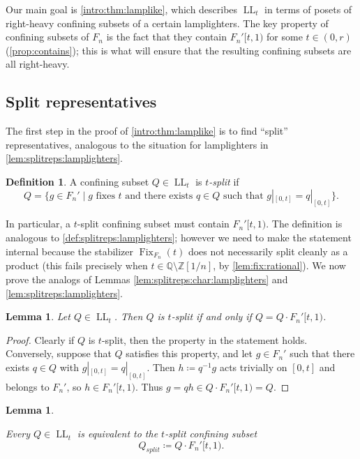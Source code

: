 \documentclass[reqno,12pt]{amsart}\setcounter{tocdepth}{1}
\newtheorem{lemma}[theorem]{Lemma}
\theoremstyle{definition}
\newtheorem{definition}[theorem]{Definition}
\newcommand{\Z}{\mathbb{Z}}
\newcommand{\Q}{\mathbb{Q}}
\DeclareMathOperator{\Fix}{Fix}
\DeclareMathOperator{\LL}{LL}
\numberwithin{equation}{section}
\begin{document}
Our main goal is \cref{intro:thm:lamplike}, which describes $\LL_t$ in terms of posets of right-heavy confining subsets of a certain lamplighters. The key property of confining subsets of $F_n$ is the fact that they contain $F_n'[t, 1)$ for some $t \in (0, r)$ (\cref{prop:contains}); this is what will ensure that the resulting confining subsets are all right-heavy.


\subsection{Split representatives}

The first step in the proof of \cref{intro:thm:lamplike} is to find ``split'' representatives, analogous to the situation for lamplighters in \cref{lem:splitreps:lamplighters}.

\begin{definition}
\label{def:splitreps:thompson}
A confining subset $Q \in \LL_t$ is \emph{$t$-split} if
\[Q = \{ g \in F_n' \mid g\text{ fixes } t \text{ and there exists } q \in Q \text{ such that } g|_{[0, t]} = q|_{[0, t]} \}.\]
\end{definition}

In particular, a $t$-split confining subset must contain $F_n'[t, 1)$. The definition is analogous to \cref{def:splitreps:lamplighters}; however we need to make the statement internal because the stabilizer $\Fix_{F_n}(t)$ does not necessarily split cleanly as a product (this fails precisely when $t \in \Q \setminus \Z[1/n]$, by \cref{lem:fix:rational}). We now prove the analogs of Lemmas \ref{lem:splitreps:char:lamplighters} and \ref{lem:splitreps:lamplighters}.

\begin{lemma}
\label{lem:splitreps:char:thompson}
Let $Q \in \LL_t$. Then $Q$ is $t$-split if and only if $Q = Q \cdot F_n'[t, 1)$.
\end{lemma}

\begin{proof}
Clearly if $Q$ is $t$-split, then the property in the statement holds. Conversely, suppose that $Q$ satisfies this property, and let $g \in F_n'$ such that there exists $q \in Q$ with $g|_{[0, t]} = q|_{[0, t]}$. Then $h \coloneqq q^{-1}g$ acts trivially on $[0, t]$ and belongs to $F_n'$, so $h \in F_n'[t, 1)$. Thus $g = q h \in Q \cdot F_n'[t, 1) = Q$.
\end{proof}

\begin{lemma}
\label{lem:splitreps:thompson}

Every $Q \in \LL_t$ is equivalent to the $t$-split confining subset \[Q_{split} \coloneqq Q \cdot F_n'[t, 1).\]
\end{lemma}
\end{document}
